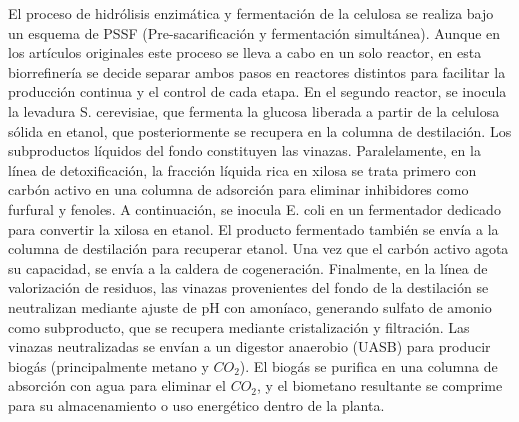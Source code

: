 \documentclass{report}
\begin{document}
\begin{flushleft}
El proceso de hidrólisis enzimática y fermentación de la celulosa se realiza bajo un esquema de PSSF (Pre-sacarificación y fermentación simultánea). Aunque en los artículos originales este proceso se lleva a cabo en un solo reactor, en esta biorrefinería se decide separar ambos pasos en reactores distintos para facilitar la producción continua y el control de cada etapa. En el segundo reactor, se inocula la levadura S. cerevisiae, que fermenta la glucosa liberada a partir de la celulosa sólida en etanol, que posteriormente se recupera en la columna de destilación. Los subproductos líquidos del fondo constituyen las vinazas.
\vspace{1em}
Paralelamente, en la línea de detoxificación, la fracción líquida rica en xilosa se trata primero con carbón activo en una columna de adsorción para eliminar inhibidores como furfural y fenoles. A continuación, se inocula E. coli en un fermentador dedicado para convertir la xilosa en etanol. El producto fermentado también se envía a la columna de destilación para recuperar etanol. Una vez que el carbón activo agota su capacidad, se envía a la caldera de cogeneración.
\vspace{1em}
Finalmente, en la línea de valorización de residuos, las vinazas provenientes del fondo de la destilación se neutralizan mediante ajuste de pH con amoníaco, generando sulfato de amonio como subproducto, que se recupera mediante cristalización y filtración. Las vinazas neutralizadas se envían a un digestor anaerobio (UASB) para producir biogás (principalmente metano y $CO_2$). El biogás se purifica en una columna de absorción con agua para eliminar el $CO_2$, y el biometano resultante se comprime para su almacenamiento o uso energético dentro de la planta.
\end{flushleft}
\end{document}
